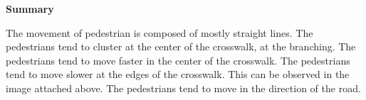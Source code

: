 \textbf{Summary}

The movement of pedestrian is composed of mostly straight lines. The pedestrians tend to cluster at the center of the crosswalk, at the branching. The pedestrians tend to move faster in the center of the crosswalk. The pedestrians tend to move slower at the edges of the crosswalk. This can be observed in the image attached above. The pedestrians tend to move in the direction of the road.